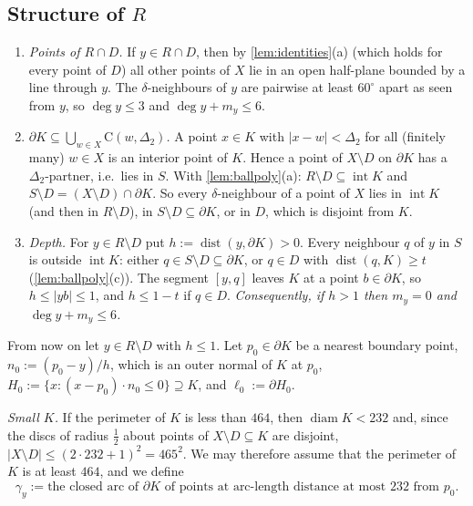 \documentclass[11pt]{amsart}
\theoremstyle{definition}
\theoremstyle{remark}
\newcommand{\Dt}{\Delta_2}
\newcommand{\dist}{\operatorname{dist}}
\newcommand{\Cc}{\mathrm{C}}      %
\begin{document}
\subsection{Structure of \texorpdfstring{$R$}{R}}
\begin{enumerate}[label=(\alph*),leftmargin=2em]
\item \emph{Points of $R\cap D$.} If $y\in R\cap D$, then by \cref{lem:identities}(a) (which holds for every point of $D$) all other points of $X$ lie in an open half-plane bounded by a line through $y$. The $\delta$-neighbours of $y$ are pairwise at least $60^\circ$ apart as seen from $y$, so $\deg y\le3$ and $\deg y+m_y\le6$.
\item \emph{$\partial K\subseteq\bigcup_{w\in X}\Cc(w,\Dt)$.} A point $x\in K$ with $|x-w|<\Dt$ for all (finitely many) $w\in X$ is an interior point of $K$. Hence a point of $X\setminus D$ on $\partial K$ has a $\Dt$-partner, i.e.\ lies in $S$. With \cref{lem:ballpoly}(a): $R\setminus D\subseteq\operatorname{int}K$ and $S\setminus D=(X\setminus D)\cap\partial K$. So every $\delta$-neighbour of a point of $X$ lies in $\operatorname{int}K$ (and then in $R\setminus D$), in $S\setminus D\subseteq\partial K$, or in $D$, which is disjoint from $K$.
\item \emph{Depth.} For $y\in R\setminus D$ put $h:=\dist(y,\partial K)>0$. Every neighbour $q$ of $y$ in $S$ is outside $\operatorname{int}K$: either $q\in S\setminus D\subseteq\partial K$, or $q\in D$ with $\dist(q,K)\ge t$ (\cref{lem:ballpoly}(c)). The segment $[y,q]$ leaves $K$ at a point $b\in\partial K$, so $h\le|yb|\le1$, and $h\le1-t$ if $q\in D$. \emph{Consequently, if $h>1$ then $m_y=0$ and $\deg y+m_y\le6$.}
\end{enumerate}

From now on let $y\in R\setminus D$ with $h\le1$. Let $p_0\in\partial K$ be a nearest boundary point, $n_0:=(p_0-y)/h$, which is an outer normal of $K$ at $p_0$, $H_0:=\{x:(x-p_0)\cdot n_0\le0\}\supseteq K$, and $\ell_0:=\partial H_0$.

\emph{Small $K$.} If the perimeter of $K$ is less than $464$, then $\operatorname{diam}K<232$ and, since the discs of radius $\frac12$ about points of $X\setminus D\subseteq K$ are disjoint, $|X\setminus D|\le(2\cdot232+1)^2=465^2$. We may therefore assume that the perimeter of $K$ is at least $464$, and we define
\[
\gamma_y:=\text{the closed arc of $\partial K$ of points at arc-length distance at most $232$ from $p_0$.}
\]
\end{document}
